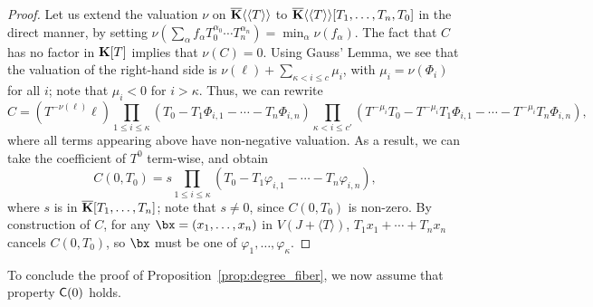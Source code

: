 \documentclass[12pt]{article}
\begin{document}
\begin{proof}
  Let us extend the valuation $\nu$ on $\overline{\mathbf{K}}\langle\langle T\rangle\rangle$
to $\overline{\mathbf{K}}\langle\langle T \rangle\rangle[T_1,\dots,T_n,T_0]$ in the
  direct manner, by setting $\nu(\sum_\alpha f_\alpha T_0^{\alpha_0}
  \cdots T_n^{\alpha_n}) = \min_\alpha \nu(f_\alpha)$. The fact that
  $C$ has no factor in $\mathbf{K}[T]$ implies that
  $\nu(C)=0$. Using Gauss' Lemma, we see that the valuation of the
  right-hand side is $\nu(\ell) + \sum_{\kappa < i \le c}\mu_i$, with $\mu_i= \nu(\Phi_i)$ for all $i$;
  note that $\mu_i < 0$ for $i > \kappa$. Thus, we can
  rewrite
  $$C =\left ({T}^{-\nu(\ell)} \ell\right ) 
  \prod_{1 \le i \le \kappa}(T_0-T_1 \Phi_{i,1} - \cdots - T_n  \Phi_{i,n} )
  \prod_{\kappa < i \le c'} ({T}^{-\mu_i}T_0-{T}^{-\mu_i}T_1 \Phi_{i,1} - \cdots - {T}^{-\mu_i}T_n  \Phi_{i,n} ),$$
  where all terms appearing above have non-negative valuation.
  As a result, we can take the coefficient of ${T}^0$ term-wise,
  and obtain
  $$C(0,T_0) = s \prod_{1 \le i \le \kappa}(T_0-T_1 \varphi_{i,1} -
  \cdots - T_n \varphi_{i,n} ),$$ where $s$ is in $\overline{\mathbf{K}}[T_1,\dots,T_n]$;
  note that $s \ne 0$, since $C(0,T_0)$ is non-zero.
 By construction of $C$, for any
  $\bx=(x_1,\dots,x_n)$ in $V(J+\langle T \rangle)$, $T_1 x_1 + \cdots + T_n x_n$
  cancels $C(0,T_0)$, so $\bx$ must be one of
  $\varphi_1,\dots,\varphi_{\kappa}$.
\end{proof}

To conclude the proof of Proposition~\ref{prop:degree_fiber}, 
we now assume that property $\mathsf{C}(0)$ holds.
\end{document}
